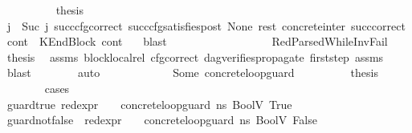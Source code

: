 \begin{isabellebody}
\isanewline
\ \ \ \ \ \ \ \ \isamarkupfalse%
\ {\isacharquery}{\kern0pt}thesis\ \isamarkupfalse%
\ {\isacartoucheopen}j\ {\isacharequal}{\kern0pt}\ Suc\ j{\isacharprime}{\kern0pt}{\isacartoucheclose}\ succ{\isacharunderscore}{\kern0pt}cfg{\isacharunderscore}{\kern0pt}correct\ succ{\isacharunderscore}{\kern0pt}cfg{\isacharunderscore}{\kern0pt}satisfies{\isacharunderscore}{\kern0pt}post\ None\ rest\ concrete{\isacharunderscore}{\kern0pt}inter{}\ succ{\isacharunderscore}{\kern0pt}correct\ {\isacartoucheopen}cont{}\ {\isacharequal}{\kern0pt}\ KEndBlock\ cont{}{\isacartoucheclose}\ \ \isamarkupfalse%
\ blast\isanewline
\ \ \ \ \ \ \isamarkupfalse%
\ \isanewline
\ \ \ \ \ \ \ \ \isamarkupfalse%
\ RedParsedWhile{\isacharunderscore}{\kern0pt}InvFail\ \isamarkupfalse%
\ {\isacharquery}{\kern0pt}thesis\ \isamarkupfalse%
\ assms{\isacharparenleft}{\kern0pt}{}{\isacharparenright}{\kern0pt}\ block{\isacharunderscore}{\kern0pt}local{\isacharunderscore}{\kern0pt}rel\ cfg{\isacharunderscore}{\kern0pt}correct\ dag{\isacharunderscore}{\kern0pt}verifies{\isacharunderscore}{\kern0pt}propagate{\isacharunderscore}{\kern0pt}{}\ first{\isacharunderscore}{\kern0pt}step\ assms{\isacharparenleft}{\kern0pt}{}{\isacharparenright}{\kern0pt}\ \isamarkupfalse%
\ blast\isanewline
\ \ \ \ \ \ \isamarkupfalse%
\ auto\isanewline
\ \ \ \ \isamarkupfalse%
\isanewline
\ \ \ \ \ \ \isamarkupfalse%
\ {\isacharparenleft}{\kern0pt}Some\ concrete{\isacharunderscore}{\kern0pt}loop{\isacharunderscore}{\kern0pt}guard{\isacharparenright}{\kern0pt}\isanewline
\ \ \ \ \ \ \isamarkupfalse%
\ \isamarkupfalse%
\ {\isacharquery}{\kern0pt}thesis\ \isanewline
\ \ \ \ \ \ \isamarkupfalse%
\ cases\isanewline
\ \ \ \ \ \ \ \ \isamarkupfalse%
\ guard{\isacharunderscore}{\kern0pt}true{\isacharcolon}{\kern0pt}\ {\isachardoublequoteopen}{\isacharparenleft}{\kern0pt}red{\isacharunderscore}{\kern0pt}expr\ {\isasymLambda}\ {\isasymGamma}\ {\isasymOmega}\ concrete{\isacharunderscore}{\kern0pt}loop{\isacharunderscore}{\kern0pt}guard\ ns{}\ {\isacharparenleft}{\kern0pt}BoolV\ True{\isacharparenright}{\kern0pt}{\isacharparenright}{\kern0pt}{\isachardoublequoteclose}\isanewline
\ \ \ \ \ \ \ \ \isamarkupfalse%
\ guard{\isacharunderscore}{\kern0pt}not{\isacharunderscore}{\kern0pt}false{\isacharcolon}{\kern0pt}\ {\isachardoublequoteopen}{\isasymnot}\ {\isacharparenleft}{\kern0pt}red{\isacharunderscore}{\kern0pt}expr\ {\isasymLambda}\ {\isasymGamma}\ {\isasymOmega}\ concrete{\isacharunderscore}{\kern0pt}loop{\isacharunderscore}{\kern0pt}guard\ ns{}\ {\isacharparenleft}{\kern0pt}BoolV\ False{\isacharparenright}{\kern0pt}{\isacharparenright}{\kern0pt}{\isachardoublequoteclose}\ \isamarkupfalse%

\end{isabellebody}
